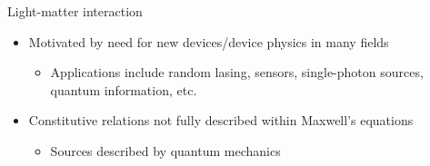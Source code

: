 \documentclass[aspectratio=169, usenames, dvipsnames]{beamer}
\begin{document}



\begin{frame}{Light-matter interaction}
  \begin{itemize}
    \item Motivated by need for new devices/device physics in many fields
      \begin{itemize}
        \item Applications include random lasing, sensors, single-photon sources, quantum information, etc.
      \end{itemize}
    \item Constitutive relations not fully described within Maxwell's equations
      \begin{itemize}
        \item Sources described by quantum mechanics
      \end{itemize}
  \end{itemize}
\end{frame}
\end{document}

